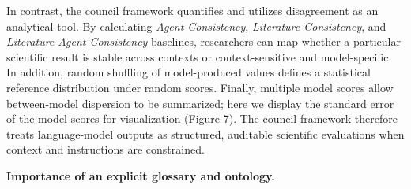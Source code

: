 \documentclass[12pt]{article}
\begin{document}
In contrast, the council framework quantifies and utilizes disagreement as an analytical tool. By calculating \emph{Agent Consistency}, \emph{Literature Consistency}, and \emph{Literature-Agent Consistency} baselines, researchers can map whether a particular scientific result is stable across contexts or context-sensitive and model-specific. In addition, random shuffling of model-produced values defines a statistical reference distribution under random scores. Finally, multiple model scores allow between-model dispersion to be summarized; here we display the standard error of the model scores for visualization (Figure 7). The council framework therefore treats language-model outputs as structured, auditable scientific evaluations when context and instructions are constrained.

\noindent\textbf{Importance of an explicit glossary and ontology.}
\end{document}
